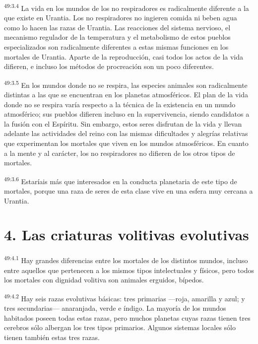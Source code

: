 \par
\textsuperscript{49:3.4} La vida en los mundos de los no respiradores es radicalmente diferente a la que existe en Urantia. Los no respiradores no ingieren comida ni beben agua como lo hacen las razas de Urantia. Las reacciones del sistema nervioso, el mecanismo regulador de la temperatura y el metabolismo de estos pueblos especializados son radicalmente diferentes a estas mismas funciones en los mortales de Urantia. Aparte de la reproducción, casi todos los actos de la vida difieren, e incluso los métodos de procreación son un poco diferentes.

\par
\textsuperscript{49:3.5} En los mundos donde no se respira, las especies animales son radicalmente distintas a las que se encuentran en los planetas atmosféricos. El plan de la vida donde no se respira varía respecto a la técnica de la existencia en un mundo atmosférico; sus pueblos difieren incluso en la supervivencia, siendo candidatos a la fusión con el Espíritu. Sin embargo, estos seres disfrutan de la vida y llevan adelante las actividades del reino con las mismas dificultades y alegrías relativas que experimentan los mortales que viven en los mundos atmosféricos. En cuanto a la mente y al carácter, los no respiradores no difieren de los otros tipos de mortales.

\par
\textsuperscript{49:3.6} Estaríais más que interesados en la conducta planetaria de este tipo de mortales, porque una raza de seres de esta clase vive en una esfera muy cercana a Urantia.

\section*{4. Las criaturas volitivas evolutivas}
\par
\textsuperscript{49:4.1} Hay grandes diferencias entre los mortales de los distintos mundos, incluso entre aquellos que pertenecen a los mismos tipos intelectuales y físicos, pero todos los mortales con dignidad volitiva son animales erguidos, bípedos.

\par
\textsuperscript{49:4.2} Hay seis razas evolutivas básicas: tres primarias ---roja, amarilla y azul; y tres secundarias--- anaranjada, verde e índigo. La mayoría de los mundos habitados poseen todas estas razas, pero muchos planetas cuyas razas tienen tres cerebros sólo albergan los tres tipos primarios. Algunos sistemas locales sólo tienen también estas tres razas.

